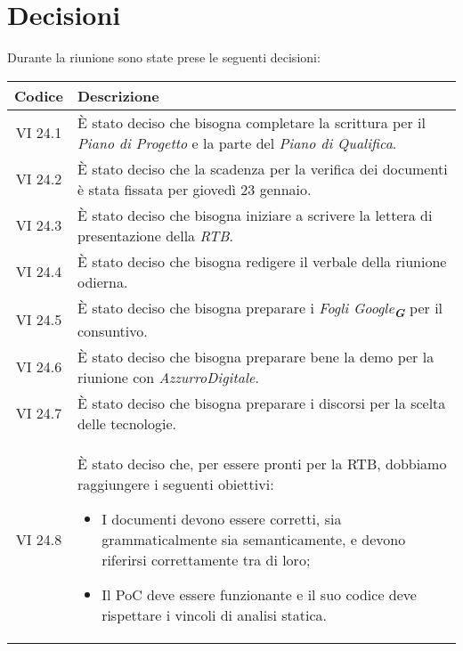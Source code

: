 
\section{Decisioni}

Durante la riunione sono state prese le seguenti decisioni:

\vspace{0.5cm}

\begin{table}[htbp]
    \centering
    \begin{tabular}{|c|p{}|}
        \hline
        \rowcolor[HTML]{C0C0C0}
        \textbf{Codice} & \textbf{Descrizione} \\
        \hline
        VI 24.1 & È stato deciso che bisogna completare la scrittura per il \emph{Piano di Progetto} e la parte del \emph{Piano di Qualifica}. \\
        \hline
        VI 24.2 & È stato deciso che la scadenza per la verifica dei documenti è stata fissata per giovedì 23 gennaio. \\
        \hline
        VI 24.3 & È stato deciso che bisogna iniziare a scrivere la lettera di presentazione della \emph{RTB}. \\
        \hline
        VI 24.4 & È stato deciso che bisogna redigere il verbale della riunione odierna. \\
        \hline
        VI 24.5 & È stato deciso che bisogna preparare i \emph{Fogli Google}\textsubscript{\textit{\textbf{G}}} per il consuntivo. \\
        \hline
        VI 24.6 & È stato deciso che bisogna preparare bene la demo per la riunione con \emph{AzzurroDigitale}. \\
        \hline
        VI 24.7 & È stato deciso che bisogna preparare i discorsi per la scelta delle tecnologie. \\
        \hline
        VI 24.8 & È stato deciso che, per essere pronti per la RTB, dobbiamo raggiungere i seguenti obiettivi:
        \begin{itemize}
        \item I documenti devono essere corretti, sia grammaticalmente sia semanticamente, e devono riferirsi correttamente tra di loro;
        \item Il PoC deve essere funzionante e il suo codice deve rispettare i vincoli di analisi statica.
        \end{itemize} \\
        \hline
    \end{tabular}
\end{table}
